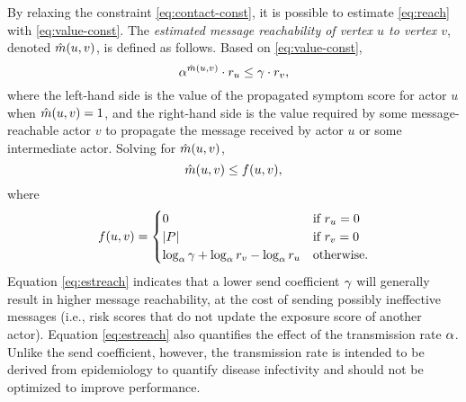 By relaxing the constraint \eqref{eq:contact-const}, it is possible to estimate \eqref{eq:reach} with \eqref{eq:value-const}. The \emph{estimated message reachability of vertex $u$ to vertex $v$}, denoted $\hat{m}(u, v)$, is defined as follows. Based on \eqref{eq:value-const},
%
\begin{equation*}
    \alpha^{\hat{m}(u, v)} \cdot r_u \leq \gamma \cdot r_v,
\end{equation*}
%
where the left-hand side is the value of the propagated symptom score for actor $u$ when $\hat{m}(u, v) = 1$, and the right-hand side is the value required by some message-reachable actor $v$ to propagate the message received by actor $u$ or some intermediate actor. Solving for $\hat{m}(u, v)$,
%
\begin{equation}\label{eq:estreach}
    \hat{m}(u, v) \leq f(u, v),
\end{equation}
%
where
%
\begin{equation*}
    f(u, v) = 
    \begin{cases} 
        0 & \text{if $r_u = 0$} \\
        \left\vert P \right\vert & \text{if $r_v = 0$} \\
        \log_{\alpha}\gamma + \log_{\alpha}r_v - \log_{\alpha}r_u & \text{otherwise.}
    \end{cases}
\end{equation*}
%
Equation \eqref{eq:estreach} indicates that a lower send coefficient $\gamma$ will generally result in higher message reachability, at the cost of sending possibly ineffective messages (i.e., risk scores that do not update the exposure score of another actor). Equation \eqref{eq:estreach} also quantifies the effect of the transmission rate $\alpha$. Unlike the send coefficient, however, the transmission rate is intended to be derived from epidemiology to quantify disease infectivity and should not be optimized to improve performance.

